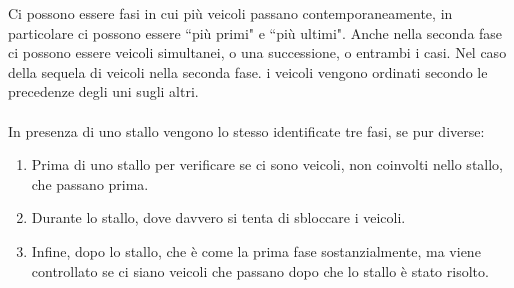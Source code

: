 Ci possono essere fasi in cui più veicoli passano contemporaneamente, in particolare ci possono essere ``più primi" e ``più ultimi". Anche nella seconda fase ci possono essere veicoli simultanei, o una successione, o entrambi i casi. Nel caso della sequela di veicoli nella seconda fase. i veicoli vengono ordinati secondo le precedenze degli uni sugli altri.
\\\\
In presenza di uno stallo vengono lo stesso identificate tre fasi, se pur diverse:
\begin{enumerate}
	\item Prima di uno stallo per verificare se ci sono veicoli, non coinvolti nello stallo, che passano prima.
	\item Durante lo stallo, dove davvero si tenta di sbloccare i veicoli.
	\item Infine, dopo lo stallo, che è come la prima fase sostanzialmente, ma viene controllato se ci siano veicoli che passano dopo che lo stallo è stato risolto.
\end{enumerate}
